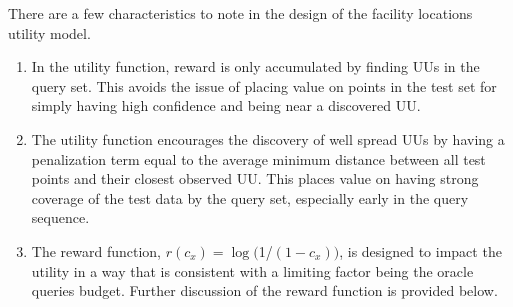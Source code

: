 \documentclass[letterpaper]{article} %
\begin{document}

There are a few characteristics to note in the design of the facility locations utility model. 
\begin{enumerate}
	\item In the utility function, reward is only accumulated by finding UUs in the query set.  This avoids the issue of placing value on points in the test set for simply having high confidence and being near a discovered UU. 
	\item The utility function encourages the discovery of well spread UUs by having a penalization term equal to the average minimum distance between all test points and their closest observed UU. This places value on having strong coverage of the test data by the query set, especially early in the query sequence. 
	\item The reward function, $r\left(c_x\right) = \log($1/$(1-c_x))$, is designed to impact the utility in a way that is consistent with a limiting factor being the oracle queries budget.  Further discussion of the reward function is provided below. 

\end{enumerate}
\end{document}

